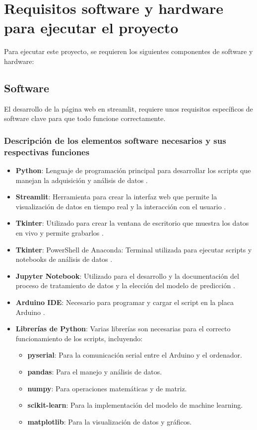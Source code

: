 
\section{Requisitos software y hardware para ejecutar el proyecto}

Para ejecutar este proyecto, se requieren los siguientes componentes de software y hardware:

\subsection{Software}
El desarrollo de la página web en streamlit, requiere unos requisitos específicos de software clave para que todo funcione correctamente.

\subsubsection{Descripción de los elementos software necesarios y sus respectivas funciones}
\begin{itemize}
\item \textbf{Python}: Lenguaje de programación principal para desarrollar los scripts que manejan la adquisición y análisis de datos \cite{Python}.
\item \textbf{Streamlit}: Herramienta para crear la interfaz web que permite la visualización de datos en tiempo real y la interacción con el usuario \cite{Streamlit}.
\item \textbf{Tkinter}: Utilizado para crear la ventana de escritorio que muestra los datos en vivo y permite grabarlos \cite{Tkinter}.
\item \textbf{Tkinter}: PowerShell de Anaconda: Terminal utilizada para ejecutar scripts y notebooks de análisis de datos \cite{PowerShell}.
\item \textbf{Jupyter Notebook}: Utilizado para el desarrollo y la documentación del proceso de tratamiento de datos y la elección del modelo de predicción \cite{Jupyter}.
\item \textbf{Arduino IDE}: Necesario para programar y cargar el script en la placa Arduino \cite{ArduinoLanguage}.
\item \textbf{Librerías de Python}: Varias librerías son necesarias para el correcto funcionamiento de los scripts, incluyendo:
\begin{itemize}
\item \textbf{pyserial}: Para la comunicación serial entre el Arduino y el ordenador.
\item \textbf{pandas}: Para el manejo y análisis de datos.
\item \textbf{numpy}: Para operaciones matemáticas y de matriz.
\item \textbf{scikit-learn}: Para la implementación del modelo de machine learning.
\item \textbf{matplotlib}: Para la visualización de datos y gráficos.
\end{itemize}
\end{itemize}


